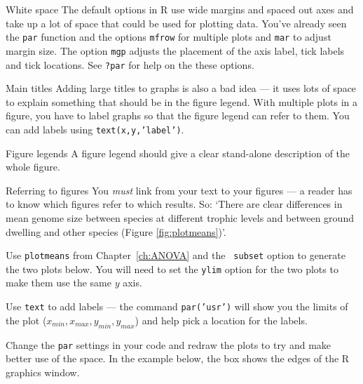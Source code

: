 \begin{compactdesc}

\item [White space] The default options in R use wide margins and 
spaced out axes and take up a lot of space that could be used for 
plotting data. You've already seen the {\tt par} function and the 
options {\tt mfrow} for multiple plots and {\tt mar} to adjust margin 
size. The option {\tt mgp} adjusts the placement of the axis label, 
tick labels and tick locations. See {\tt ?par} for help on the these 
options.

\item [Main titles] Adding large titles to graphs is also a bad idea 
--- it uses lots of space to explain something that should be in the 
figure legend. With multiple plots in a figure, you have to label 
graphs so that the figure legend can refer to them. You can add labels 
using {\tt text(x,y,'label')}.

\item [Figure legends] A figure legend should give a clear stand-alone 
description of the whole figure. 

\item [Referring to figures] You {\it must} link from your text to 
your figures --- a reader has to know which figures refer to which 
results. So: `There are clear differences in mean genome size between 
species at different trophic levels and between ground dwelling and 
other species (Figure \ref{fig:plotmeans})'. 

\end{compactdesc}

\begin{compactitem}[$\quad\star$]
	
	\item Use {\tt plotmeans} from Chapter~\ref{ch:ANOVA} and the {\tt 
	subset} option to generate the two plots below. You will need to set 
	the {\tt ylim} option for the two plots to make them use the same $y$ 
	axis.
	
	\item Use {\tt text} to add labels --- the command {\tt par('usr')} 
	will show you the limits of the plot ($x_{min}, x_{max}, y_{min}, 
	y_{max}$) and help pick a location for the labels.

	\item Change the {\tt par} settings in your code and redraw the plots 
	to try and make better use of the space. In the example below, the 
	box shows the edges of the R graphics window.

\end{compactitem}
 
